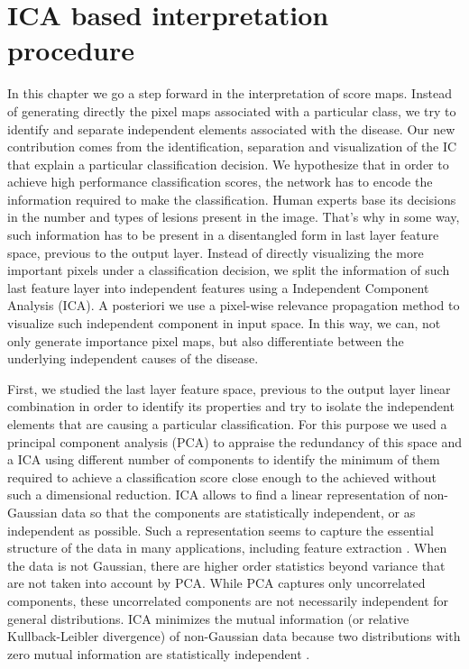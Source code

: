 \section{ICA based interpretation procedure}

In this chapter we go a step forward in the interpretation of score maps. Instead of generating directly the pixel maps associated with a particular class, we try to identify and separate independent elements associated with the disease. Our new contribution comes from the identification, separation and visualization of the IC that explain a particular classification decision. We hypothesize that in order to achieve high performance classification scores, the network has to encode the information required to make the classification. Human experts base its decisions in the number and types of lesions present in the image. That's why in some way, such information has to be present in a disentangled form in last layer feature space, previous to the output layer.  Instead of directly visualizing the more important pixels under a classification decision, we split the information of such last feature layer into independent features using a Independent Component Analysis (ICA). A posteriori we use a pixel-wise relevance propagation method to visualize such independent component in input space. In this way, we can, not only generate importance pixel maps, but also differentiate between the underlying independent causes of the disease.

First, we studied the last layer feature space, previous to the output layer linear combination in order to identify its properties and try to isolate the independent elements that are causing a particular classification. For this purpose we used a principal component analysis (PCA)  \citep{pearson1901principal} to appraise the redundancy of this space and a ICA \citep{hyvarinen2000independent} using different number of components to identify the minimum of them required to achieve a classification score close enough to the achieved without such a dimensional reduction.  ICA allows to find a linear representation of non-Gaussian data so that the components are statistically independent, or as independent as possible. Such a representation seems to capture the essential structure of the data in many applications, including feature extraction \citep{hyvarinen2000independent}. When the data is not Gaussian, there are higher order statistics beyond variance that are not taken into account by PCA. While PCA captures only uncorrelated components, these uncorrelated components are not necessarily independent for general distributions. ICA minimizes the mutual information (or relative Kullback-Leibler divergence) of non-Gaussian data because two distributions with zero mutual information are statistically independent \citep{comon1992independent}. 

